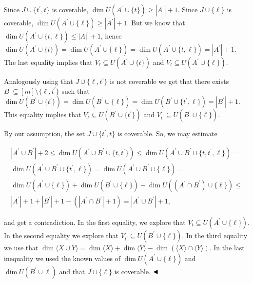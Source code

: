 Since $J\cup\{t^{\prime},t\}$ is coverable, $\dim U(A^{\prime}\cup\{t\})\geq|A^{\prime}|+1$.
Since $J\cup\{\ell\}$ is coverable, $\dim U(A^{\prime}\cup\{\ell\})\geq|A^{\prime}|+1$. But we know that $\dim U(A^{\prime}\cup\{t,\ell\})\leq|A|^{\prime}+1$, hence
$\dim U(A^{\prime}\cup\{t\})=\dim U(A^{\prime}\cup\{\ell\})=\dim U(A^{\prime}\cup\{t,\ell\})=|A^{\prime}|+1$. The last equality implies that $V_{\ell}\subseteq U(A^{\prime}\cup\{t\})$ and
$V_{t}\subseteq U(A^{\prime}\cup\{\ell\})$.\par



Analogously using that $J\cup\{\ell,t^{\prime}\}$ is not coverable we get that there exists $B^{\prime}\subseteq[m]\setminus\{\ell,t^{\prime}\}$ such that
$\dim U(B^{\prime}\cup\{t^{\prime}\})=\dim U(B^{\prime}\cup\{\ell\})=\dim U(B^{\prime}\cup\{t^{\prime},\ell\})=|B^{\prime}|+1$. This equality implies that $V_{\ell}\subseteq U(B^{\prime}\cup\{t^{\prime}\})$ and
$V_{t^{\prime}}\subseteq U(B^{\prime}\cup\{\ell\})$.\par



By our assumption, the set $J\cup\{t^{\prime},t\}$ is coverable. So, we may estimate\par





 
\[\begin{gathered}|A^{\prime}\cup B^{\prime}|+2\leq\dim U(A^{\prime}\cup B^{\prime}\cup\{t,t^{\prime}\})\leq\dim U(A^{\prime}\cup B^{\prime}\cup\{t,t^{\prime},\ell\})=\\
\dim U(A^{\prime}\cup B^{\prime}\cup\{t^{\prime},\ell\})=\dim U(A^{\prime}\cup
B^{\prime}\cup\{\ell\})=\\
\dim U(A^{\prime}\cup\{\ell\})+\dim U(B^{\prime}\cup\{\ell\})-\dim U((A^{\prime}\cap B^{\prime})\cup\{\ell\})\leq\\
|A^{\prime}|+1+|B^{\prime}|+1-(|A^{\prime}\cap B^{\prime}|+1)=|A^{\prime}\cup B^{\prime}|+1,\end{gathered}\] 
 





and get a contradiction.
In the first equality, we explore that $V_{t}\subseteq U(A^{\prime}\cup\{\ell\})$. In the second equality we explore that $V_{t^{\prime}}\subseteq U(B^{\prime}\cup\{\ell\})$.
In the third equality we use that $\dim\langle X\cup Y\rangle=\dim\langle X\rangle+\dim\langle Y\rangle-\dim(\langle X\rangle\cap\langle Y\rangle)$. In the last inequality we used the known values of $\dim U(A^{\prime}\cup\{\ell\})$ and $\dim U(B^{\prime}\cup\ell)$ and that $J\cup\{\ell\}$ is coverable.
$\hfill\blacktriangleleft$\par



